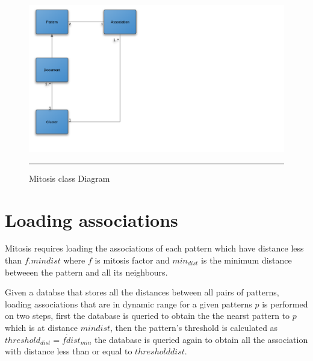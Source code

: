 \begin{figure}[htbp]
	\centering
		\includegraphics{./Figures/Mitosis_6.png}
		\rule{25em}{0.3pt}
	\caption[Mitosis class Diagram]{Mitosis class Diagram}
	\label{fig:mitosis_6}
\end{figure}

\section{Loading associations}
Mitosis requires loading the associations of each pattern which have distance less than $f.min{dist}$ where $f$ is mitosis factor and $min_{dist}$ is the minimum distance betweeen the pattern and all its neighbours.

Given a databse that stores all the distances between all pairs of patterns, loading associations that are in dynamic range for a given patterns $p$ is performed on two steps, first the database is queried to obtain the the nearst pattern to $p$ which is at distance $min{dist}$, then the pattern's threshold is calculated as $threshold_{dist} = f \dot dist_{min}$ the database is queried again to obtain all the association with distance less than or equal to $threshold{dist}$.

